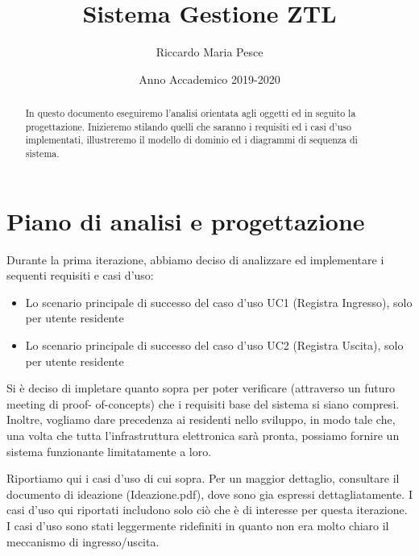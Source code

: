 \documentclass[12pt, letterpaper]{article}
\title{Sistema Gestione ZTL}
\author{Riccardo Maria Pesce}
\date{Anno Accademico 2019-2020}
\begin{document}
\begin{titlepage}

\maketitle

\begin{abstract}

\noindent
In questo documento eseguiremo l'analisi orientata
agli oggetti ed in seguito la progettazione.
Inizieremo stilando quelli che saranno i requisiti 
ed i casi d'uso implementati, illustreremo il modello
di dominio ed i diagrammi di sequenza di sistema.

\end{abstract}
\end{titlepage}

\tableofcontents{}

\pagebreak

\section{Piano di analisi e progettazione}
Durante la prima iterazione, abbiamo deciso di 
analizzare ed implementare i sequenti requisiti 
e casi d'uso:
\begin{itemize}
    \item Lo scenario principale di successo del 
    caso d'uso UC1 (Registra Ingresso), solo per 
    utente residente
    \item Lo scenario principale di successo del 
    caso d'uso UC2 (Registra Uscita), solo per 
    utente residente
\end{itemize}
Si è deciso di impletare quanto sopra per poter 
verificare (attraverso un futuro meeting di proof-
of-concepts) che i requisiti base del sistema si 
siano compresi.
Inoltre, vogliamo dare precedenza ai residenti nello 
sviluppo, in modo tale che, una volta che tutta
l'infrastruttura elettronica sarà pronta, possiamo
fornire un sistema funzionante limitatamente a
loro.
\linebreak

\noindent
Riportiamo qui i casi d'uso di cui sopra. Per 
un maggior dettaglio, consultare il documento di 
ideazione (Ideazione.pdf), dove sono gia espressi
dettagliatamente. I casi d'uso qui riportati 
includono solo ciò che è di interesse per questa 
iterazione. I casi d'uso sono stati leggermente 
ridefiniti in quanto non era molto chiaro il 
meccanismo di ingresso/uscita.
\end{document}
